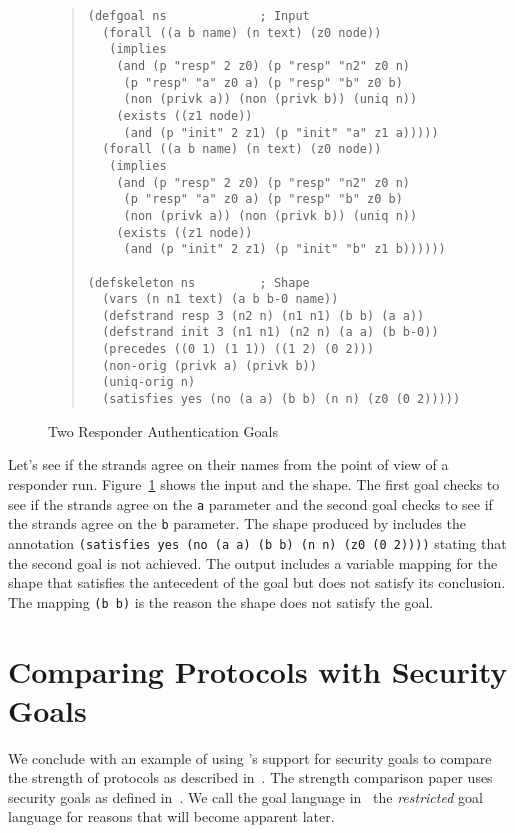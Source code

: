 \documentclass[12pt]{article}
\begin{document}
\begin{figure}
\begin{quote}
\begin{verbatim}
(defgoal ns             ; Input
  (forall ((a b name) (n text) (z0 node))
   (implies
    (and (p "resp" 2 z0) (p "resp" "n2" z0 n)
     (p "resp" "a" z0 a) (p "resp" "b" z0 b)
     (non (privk a)) (non (privk b)) (uniq n))
    (exists ((z1 node))
     (and (p "init" 2 z1) (p "init" "a" z1 a)))))
  (forall ((a b name) (n text) (z0 node))
   (implies
    (and (p "resp" 2 z0) (p "resp" "n2" z0 n)
     (p "resp" "a" z0 a) (p "resp" "b" z0 b)
     (non (privk a)) (non (privk b)) (uniq n))
    (exists ((z1 node))
     (and (p "init" 2 z1) (p "init" "b" z1 b))))))

(defskeleton ns         ; Shape
  (vars (n n1 text) (a b b-0 name))
  (defstrand resp 3 (n2 n) (n1 n1) (b b) (a a))
  (defstrand init 3 (n1 n1) (n2 n) (a a) (b b-0))
  (precedes ((0 1) (1 1)) ((1 2) (0 2)))
  (non-orig (privk a) (privk b))
  (uniq-orig n)
  (satisfies yes (no (a a) (b b) (n n) (z0 (0 2)))))
\end{verbatim}
\end{quote}
\caption{Two Responder Authentication Goals}\label{fig:ns resp goals}
\end{figure}

Let's see if the strands agree on their names from the point of view
of a responder run.  Figure~\ref{fig:ns resp goals} shows the input
and the shape.  The first goal checks to see if the strands agree on
the \texttt{a} parameter and the second goal checks to see if the
strands agree on the \texttt{b} parameter.  The shape produced by
{\cpsa} includes the annotation \texttt{(satisfies yes (no (a a) (b b)
  (n n) (z0 (0 2))))} stating that the second goal is not achieved.
The output includes a variable mapping for the shape that
satisfies the antecedent of the goal but does not satisfy its
conclusion.  The mapping \texttt{(b b)} is the reason the shape
does not satisfy the goal.

\section{Comparing Protocols with Security Goals}\label{sec:comparing}

We conclude with an example of using {\cpsa}'s support for security
goals to compare the strength of protocols as described
in~\cite{GuttmanLiskovRowe14}.  The strength comparison paper uses
security goals as defined in~\cite{Guttman14}.  We call the goal
language in~\cite{Guttman14} the \emph{restricted} goal language for
reasons that will become apparent later.
\end{document}
